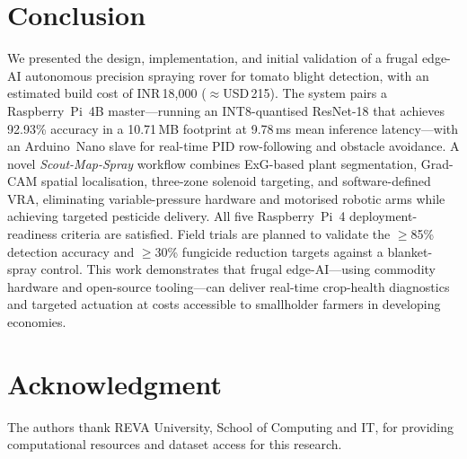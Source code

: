 \documentclass[conference]{IEEEtran}
\begin{document}
\section{Conclusion}
\label{sec:conclusion}

We presented the design, implementation, and initial validation of a
frugal edge-AI autonomous precision spraying rover for tomato blight
detection, with an estimated build cost of INR\,18,000 ($\approx$USD\,215).
The system pairs a Raspberry~Pi~4B master---running an INT8-quantised
ResNet-18 that achieves 92.93\% accuracy in a 10.71\,MB footprint at
9.78\,ms mean inference latency---with an Arduino~Nano slave for
real-time PID row-following and obstacle avoidance. A novel
\emph{Scout-Map-Spray} workflow combines ExG-based plant segmentation,
Grad-CAM spatial localisation, three-zone solenoid targeting, and
software-defined VRA, eliminating variable-pressure hardware and
motorised robotic arms while achieving targeted pesticide delivery.
All five Raspberry~Pi~4 deployment-readiness criteria are satisfied.
Field trials are planned to validate the $\geq$85\% detection accuracy
and $\geq$30\% fungicide reduction targets against a blanket-spray
control. This work demonstrates that frugal edge-AI---using commodity
hardware and open-source tooling---can deliver real-time crop-health
diagnostics and targeted actuation at costs accessible to smallholder
farmers in developing economies.

\section*{Acknowledgment}
The authors thank REVA University, School of Computing and IT, for
providing computational resources and dataset access for this research.
\end{document}
